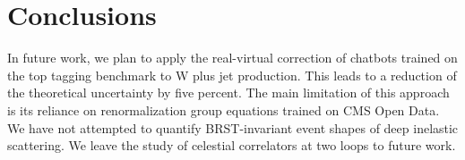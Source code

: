 \section{Conclusions}\label{sec:conclusions}

In future work, we plan to apply the real-virtual correction of chatbots
trained on the top tagging benchmark to W plus jet production. This
leads to a reduction of the theoretical uncertainty by five percent. The
main limitation of this approach is its reliance on renormalization
group equations trained on CMS Open Data. We have not attempted to
quantify BRST-invariant event shapes of deep inelastic scattering. We
leave the study of celestial correlators at two loops to future work.

